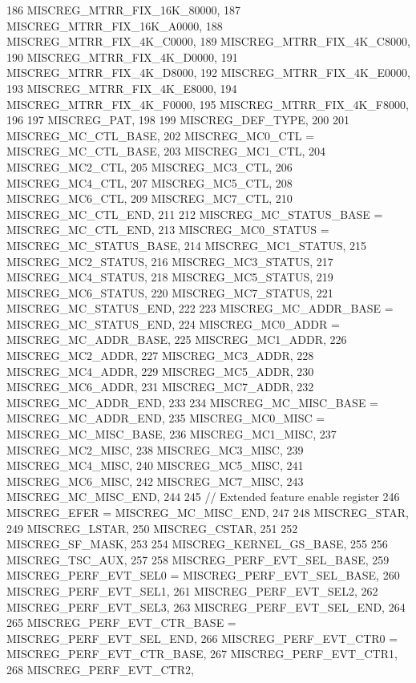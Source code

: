 \begin{DoxyCode}
{186         MISCREG_MTRR_FIX_16K_80000,
187         MISCREG_MTRR_FIX_16K_A0000,
188         MISCREG_MTRR_FIX_4K_C0000,
189         MISCREG_MTRR_FIX_4K_C8000,
190         MISCREG_MTRR_FIX_4K_D0000,
191         MISCREG_MTRR_FIX_4K_D8000,
192         MISCREG_MTRR_FIX_4K_E0000,
193         MISCREG_MTRR_FIX_4K_E8000,
194         MISCREG_MTRR_FIX_4K_F0000,
195         MISCREG_MTRR_FIX_4K_F8000,
196 
197         MISCREG_PAT,
198 
199         MISCREG_DEF_TYPE,
200 
201         MISCREG_MC_CTL_BASE,
202         MISCREG_MC0_CTL = MISCREG_MC_CTL_BASE,
203         MISCREG_MC1_CTL,
204         MISCREG_MC2_CTL,
205         MISCREG_MC3_CTL,
206         MISCREG_MC4_CTL,
207         MISCREG_MC5_CTL,
208         MISCREG_MC6_CTL,
209         MISCREG_MC7_CTL,
210         MISCREG_MC_CTL_END,
211 
212         MISCREG_MC_STATUS_BASE = MISCREG_MC_CTL_END,
213         MISCREG_MC0_STATUS = MISCREG_MC_STATUS_BASE,
214         MISCREG_MC1_STATUS,
215         MISCREG_MC2_STATUS,
216         MISCREG_MC3_STATUS,
217         MISCREG_MC4_STATUS,
218         MISCREG_MC5_STATUS,
219         MISCREG_MC6_STATUS,
220         MISCREG_MC7_STATUS,
221         MISCREG_MC_STATUS_END,
222 
223         MISCREG_MC_ADDR_BASE = MISCREG_MC_STATUS_END,
224         MISCREG_MC0_ADDR = MISCREG_MC_ADDR_BASE,
225         MISCREG_MC1_ADDR,
226         MISCREG_MC2_ADDR,
227         MISCREG_MC3_ADDR,
228         MISCREG_MC4_ADDR,
229         MISCREG_MC5_ADDR,
230         MISCREG_MC6_ADDR,
231         MISCREG_MC7_ADDR,
232         MISCREG_MC_ADDR_END,
233 
234         MISCREG_MC_MISC_BASE = MISCREG_MC_ADDR_END,
235         MISCREG_MC0_MISC = MISCREG_MC_MISC_BASE,
236         MISCREG_MC1_MISC,
237         MISCREG_MC2_MISC,
238         MISCREG_MC3_MISC,
239         MISCREG_MC4_MISC,
240         MISCREG_MC5_MISC,
241         MISCREG_MC6_MISC,
242         MISCREG_MC7_MISC,
243         MISCREG_MC_MISC_END,
244 
245         // Extended feature enable register
246         MISCREG_EFER = MISCREG_MC_MISC_END,
247 
248         MISCREG_STAR,
249         MISCREG_LSTAR,
250         MISCREG_CSTAR,
251 
252         MISCREG_SF_MASK,
253 
254         MISCREG_KERNEL_GS_BASE,
255 
256         MISCREG_TSC_AUX,
257 
258         MISCREG_PERF_EVT_SEL_BASE,
259         MISCREG_PERF_EVT_SEL0 = MISCREG_PERF_EVT_SEL_BASE,
260         MISCREG_PERF_EVT_SEL1,
261         MISCREG_PERF_EVT_SEL2,
262         MISCREG_PERF_EVT_SEL3,
263         MISCREG_PERF_EVT_SEL_END,
264 
265         MISCREG_PERF_EVT_CTR_BASE = MISCREG_PERF_EVT_SEL_END,
266         MISCREG_PERF_EVT_CTR0 = MISCREG_PERF_EVT_CTR_BASE,
267         MISCREG_PERF_EVT_CTR1,
268         MISCREG_PERF_EVT_CTR2,
}
\end{DoxyCode}
